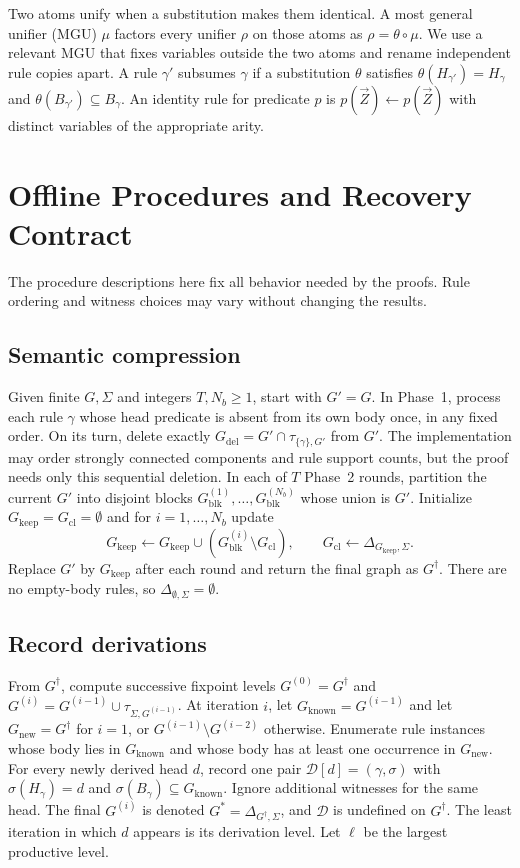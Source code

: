 \documentclass[conference]{IEEEtran}
\theoremstyle{definition}
\newcommand{\vect}[1]{\vec{#1}}
\newcommand{\Gc}{G^{\dagger}}
\newcommand{\Gdel}{G_{\mathrm{del}}}
\newcommand{\Gblock}{G_{\mathrm{blk}}}
\newcommand{\Gkeep}{G_{\mathrm{keep}}}
\newcommand{\Gcl}{G_{\mathrm{cl}}}
\newcommand{\Gknown}{G_{\mathrm{known}}}
\newcommand{\Gfront}{G_{\mathrm{new}}}
\newcommand{\Sig}{\Sigma}
\newcommand{\Der}{\mathcal{D}}
\begin{document}
Two atoms unify when a substitution makes them identical. A most general
unifier (MGU) $\mu$ factors every unifier $\rho$ on those atoms as
$\rho=\theta\circ\mu$. We use a relevant MGU that fixes variables
outside the two atoms and rename independent rule copies apart. A rule
$\gamma'$ subsumes $\gamma$ if a substitution $\theta$ satisfies
$\theta(H_{\gamma'})=H_\gamma$ and
$\theta(B_{\gamma'})\subseteq B_\gamma$. An identity rule for predicate
$p$ is $p(\vect{Z})\leftarrow p(\vect{Z})$ with distinct variables of
the appropriate arity.

\section{Offline Procedures and Recovery Contract}
\label{sec:procedures}
The procedure descriptions here fix all behavior needed by the proofs.
Rule ordering and witness choices may vary without changing the results.

\subsection{Semantic compression}
\label{alg:compress}
Given finite $G,\Sig$ and integers $T,N_b\geq1$, start with $G'=G$.
In Phase~1, process each rule $\gamma$ whose head predicate is absent
from its own body once, in any fixed order. On its turn, delete exactly
$\Gdel=G'\cap\tau_{\{\gamma\},G'}$ from $G'$. The implementation may
order strongly connected components and rule support counts, but the
proof needs only this sequential deletion. In each of $T$ Phase~2
rounds, partition the current $G'$ into disjoint blocks
$\Gblock^{(1)},\ldots,\Gblock^{(N_b)}$ whose union is $G'$.
Initialize $\Gkeep=\Gcl=\emptyset$ and for $i=1,\ldots,N_b$ update
\begin{equation}
\label{eq:block-update}
\Gkeep\leftarrow\Gkeep\cup(\Gblock^{(i)}\setminus\Gcl),\qquad
\Gcl\leftarrow\Delta_{\Gkeep,\Sig}.
\end{equation}
Replace $G'$ by $\Gkeep$ after each round and return the final graph as
$\Gc$. There are no empty-body rules, so
$\Delta_{\emptyset,\Sig}=\emptyset$.

\subsection{Record derivations}
\label{alg:derive}
From $\Gc$, compute successive fixpoint levels
$G^{(0)}=\Gc$ and
$G^{(i)}=G^{(i-1)}\cup\tau_{\Sig,G^{(i-1)}}$.
At iteration $i$, let $\Gknown=G^{(i-1)}$ and let $\Gfront=\Gc$ for
$i=1$, or $G^{(i-1)}\setminus G^{(i-2)}$ otherwise. Enumerate rule
instances whose body lies in $\Gknown$ and whose body has at least
one occurrence in $\Gfront$. For every newly derived head $d$, record
one pair $\Der[d]=(\gamma,\sigma)$ with
$\sigma(H_\gamma)=d$ and $\sigma(B_\gamma)\subseteq\Gknown$.
Ignore additional witnesses for the same head. The final $G^{(i)}$
is denoted $G^{*}=\Delta_{\Gc,\Sig}$, and $\Der$ is undefined on
$\Gc$. The least iteration in which $d$ appears is its derivation
level. Let $\ell$ be the largest productive level.
\end{document}
